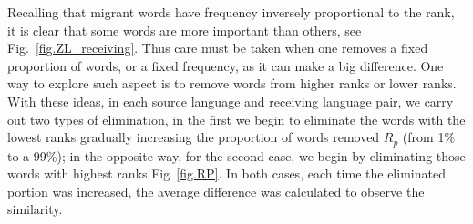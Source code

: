 \documentclass[10pt,letterpaper]{article} %
\newcommand{\fref}[1]{Fig.~\ref{#1}}
\begin{document}



Recalling that migrant words have frequency inversely proportional to the rank,
it is clear that some words are more important than others, see
\fref{fig.ZL_receiving}.  Thus care must be taken when one removes a fixed
proportion of words, or a fixed frequency, as it can make a big difference. 
One way to explore such aspect is to remove words from higher ranks
or lower ranks. 
With these ideas, in each source language
and receiving language pair, we carry out two types of elimination, in the
first we begin to eliminate the words with the lowest ranks gradually 
increasing the proportion of words removed $R_{p}$ (from 1$\%$ to a
99$\%$); in the opposite way, for the second case,  we begin by
eliminating those words with highest ranks Fig~\ref{fig.RP}. In both cases,
each time the eliminated portion was increased, the average difference was
calculated to observe the similarity.

% 
\end{document}
